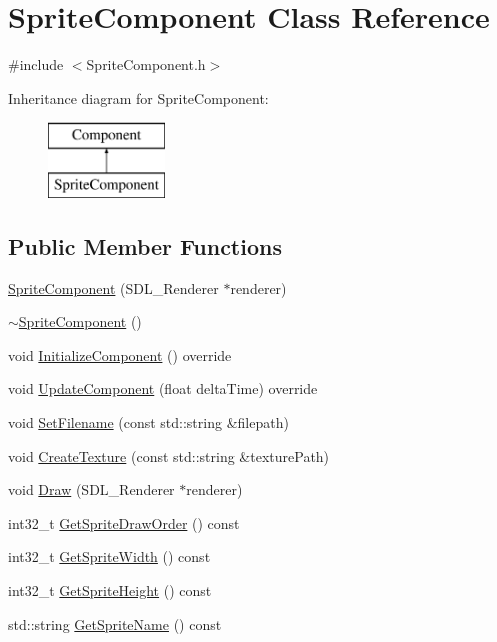 \hypertarget{class_sprite_component}{}\section{Sprite\+Component Class Reference}
\label{class_sprite_component}


{\ttfamily \#include $<$Sprite\+Component.\+h$>$}

Inheritance diagram for Sprite\+Component\+:\begin{figure}[H]
\begin{center}
\leavevmode
\includegraphics[height=2.000000cm]{class_sprite_component}
\end{center}
\end{figure}
\subsection*{Public Member Functions}
\begin{DoxyCompactItemize}
\item 
\mbox{\hyperlink{class_sprite_component_a5d7580c546b06d25e480ae7a20084120}{Sprite\+Component}} (S\+D\+L\+\_\+\+Renderer $\ast$renderer)
\item 
\mbox{\hyperlink{class_sprite_component_add14acc8523a724c112e6c93b750b60e}{$\sim$\+Sprite\+Component}} ()
\item 
void \mbox{\hyperlink{class_sprite_component_af4040c615bebb4aea20f274f77e36733}{Initialize\+Component}} () override
\item 
void \mbox{\hyperlink{class_sprite_component_aba00f9c0ecc0a0de41f271267c5440ff}{Update\+Component}} (float delta\+Time) override
\item 
void \mbox{\hyperlink{class_sprite_component_a429074e2f4eb31f92dff67fe1b89da55}{Set\+Filename}} (const std\+::string \&filepath)
\item 
void \mbox{\hyperlink{class_sprite_component_af71d7595507094e09d415cfa50e53fc3}{Create\+Texture}} (const std\+::string \&texture\+Path)
\item 
void \mbox{\hyperlink{class_sprite_component_ac696d85039713b2afbf4db0b361177b1}{Draw}} (S\+D\+L\+\_\+\+Renderer $\ast$renderer)
\item 
int32\+\_\+t \mbox{\hyperlink{class_sprite_component_aab677bb3904863fafcfaa4cb4790dd2a}{Get\+Sprite\+Draw\+Order}} () const
\item 
int32\+\_\+t \mbox{\hyperlink{class_sprite_component_a38889ac972abef595e94afe588a0f5f1}{Get\+Sprite\+Width}} () const
\item 
int32\+\_\+t \mbox{\hyperlink{class_sprite_component_a7a060e8695f35c136a78731b3d865f6e}{Get\+Sprite\+Height}} () const
\item 
std\+::string \mbox{\hyperlink{class_sprite_component_a20d83f167d220ec3b653bcd31262d6d7}{Get\+Sprite\+Name}} () const
\end{DoxyCompactItemize}
